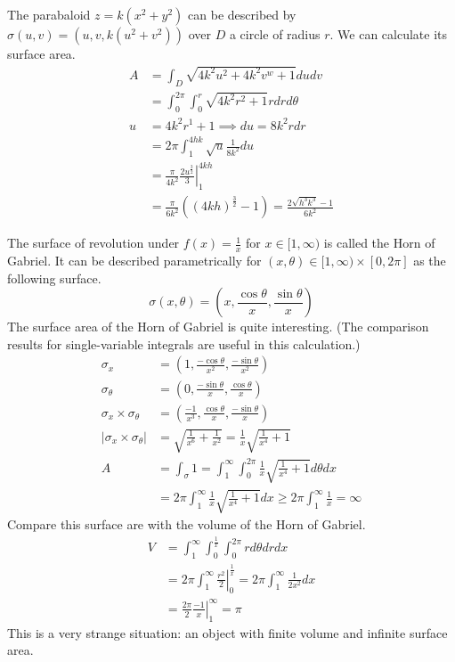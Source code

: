 \documentclass[fleqn,letterpaper]{report}
\begin{document}
\begin{example}
The parabaloid $z = k(x^2 +y^2)$ can be
described by $\sigma(u,v) = (u,v,k(u^2+v^2))$ over $D$ a circle
of radius $r$. We can calculate its surface area.
\begin{align*}
A & = \int_D \sqrt{4k^2 u^2 + 4k^2 v^w + 1} du dv \\
& = \int_0^{2\pi} \int_0^r \sqrt{4k^2 r^2 + 1} r dr d \theta
\\
u & = 4k^2 r^1 + 1 \implies du = 8k^2 r dr \\
& = 2\pi \int_1^{4hk} \sqrt{u} \frac{1}{8k^2} du \\
& = \left. \frac{\pi}{4k^2} \frac{2u^{\frac{3}{2}}}{3}
\right|_1^{4kh} \\
& = \frac{\pi}{6k^2} \left( (4kh)^{\frac{3}{2}} -1 \right) =
\frac{2\sqrt{h^3k^3} - 1}{6k^2}
\end{align*}
\end{example}

\begin{example}
The surface of revolution under $f(x) = \frac{1}{x}$ for $x
\in [1,\infty)$ is called the Horn of Gabriel. It can be
described parametrically for $(x,\theta) \in [1, \infty) \times
[0, 2\pi]$ as the following surface.
\begin{equation*}
\sigma(x,\theta) = \left( x, \frac{\cos \theta}{x}, \frac{\sin
\theta}{x} \right) 
\end{equation*}
The surface area of the Horn of Gabriel is quite interesting.
(The comparison results for single-variable integrals are
useful in this calculation.) 
\begin{align*}
\sigma_x & = \left( 1, \frac{-\cos \theta}{x^2}, \frac{-\sin
\theta}{x^2} \right) \\
\sigma_{\theta} & = \left( 0, \frac{-\sin \theta}{x},
\frac{\cos \theta}{x} \right) \\
\sigma_x \times \sigma_{\theta} & = \left( \frac{-1}{x^3},
\frac{\cos \theta}{x}, \frac{-\sin \theta}{x} \right) \\
|\sigma_x \times \sigma_\theta| & = \sqrt{ \frac{1}{x^6} +
\frac{1}{x^2}} = \frac{1}{x} \sqrt{ \frac{1}{x^4} + 1} \\
A & = \int_\sigma 1 = \int_1^{\infty} \int_0^{2\pi}
\frac{1}{x} \sqrt{ \frac{1}{x^4} + 1} d\theta dx \\
& = 2\pi \int_1^{\infty} \frac{1}{x} \sqrt{ \frac{1}{x^4} +
1} dx \geq 2\pi \int_1^\infty \frac{1}{x} = \infty
\end{align*}
Compare this surface are with the volume of the Horn of
Gabriel.
\begin{align*}
V & = \int_1^{\infty} \int_0^{\frac{1}{x}} \int_0^{2\pi} r d
\theta dr dx \\
& = 2\pi \int_1^\infty \left. \frac{r^2}{2}
\right|_0^{\frac{1}{x}} = 2\pi \int_1^\infty \frac{1}{2x^2} dx
\\
& = \left. \frac{2\pi}{2} \frac{-1}{x} \right|_1^\infty = \pi
\end{align*}
This is a very strange situation: an object with finite
volume and infinite surface area.
\end{example}
\end{document}
